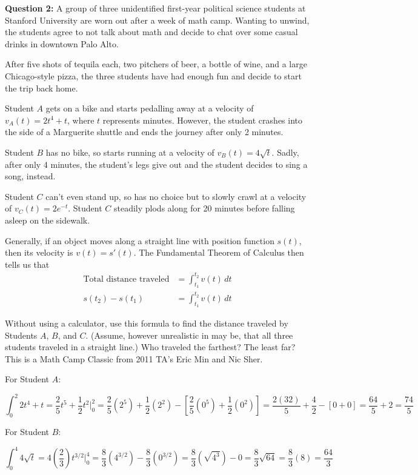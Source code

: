 \documentclass[12pt]{article}
\begin{document}
\noindent \textbf{Question 2:} A group of three unidentified first-year political science students at Stanford University are worn out after a week of math camp. Wanting to unwind, the students agree to not talk about math and decide to chat over some casual drinks in downtown Palo Alto.

After five shots of tequila each, two pitchers of beer, a bottle of wine, and a large Chicago-style pizza, the three students have had enough fun and decide to start the trip back home.

Student $A$ gets on a bike and starts pedalling away at a velocity of $v_A(t) = 2t^4 + t$, where $t$ represents minutes. However, the student crashes into the side of a Marguerite shuttle and ends the journey after only 2 minutes.

Student $B$ has no bike, so starts running at a velocity of $v_B(t) = 4\sqrt{t}$. Sadly, after only 4 minutes, the student's legs give out and the student decides to sing a song, instead.

Student $C$ can't even stand up, so has no choice but to slowly crawl at a velocity of $v_C(t) = 2e^{-t}$. Student $C$ steadily plods along for 20 minutes before falling asleep on the sidewalk.

Generally, if an object moves along a straight line with position function $s(t)$, then its velocity is $v(t) = s'(t)$. The Fundamental Theorem of Calculus then tells us that
\begin{align*}
\textrm{Total distance traveled} &= \int_{t_1}^{t_2} v(t) \,dt\\
s(t_2) - s(t_1) &= \int_{t_1}^{t_2} v(t) \,dt
\end{align*}

Without using a calculator, use this formula to find the distance traveled by Students $A$, $B$, and $C$. (Assume, however unrealistic in may be, that all three students traveled in a straight line.) Who traveled the farthest? The least far?\\

This is a Math Camp Classic from 2011 TA's Eric Min and Nic Sher. 

For Student $A$:

$$\int_{0}^2 2t^4 + t = \frac{2}{5}t^5 + \frac{1}{2}t^2 \bigg|_0^2 = \frac{2}{5} (2^5) + \frac{1}{2}(2^2) - \left[\frac{2}{5} (0^5) + \frac{1}{2}(0^2)\right] = \frac{2(32)}{5} + \frac{4}{2} - [0 + 0] = \frac{64}{5} + 2 = \frac{74}{5}$$

For Student $B$:

$$\int_0^4 4\sqrt{t} = 4\left(\frac{2}{3}\right) t^{3/2} \bigg|_0^4 = \frac{8}{3}(4^{3/2}) - \frac{8}{3} (0^{3/2}) = \frac{8}{3} \left(\sqrt{4^3}\right) - 0 = \frac{8}{3} \sqrt{64} = \frac{8}{3} (8) = \frac{64}{3}$$
\end{document}
